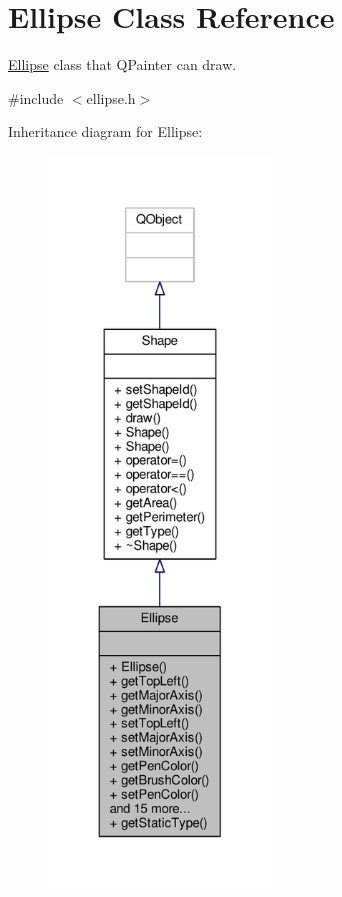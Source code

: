\hypertarget{classEllipse}{}\section{Ellipse Class Reference}
\label{classEllipse}


\hyperlink{classEllipse}{Ellipse} class that Q\+Painter can draw.  




{\ttfamily \#include $<$ellipse.\+h$>$}



Inheritance diagram for Ellipse\+:\nopagebreak
\begin{figure}[H]
\begin{center}
\leavevmode
\includegraphics[height=550pt]{classEllipse__inherit__graph}
\end{center}
\end{figure}


